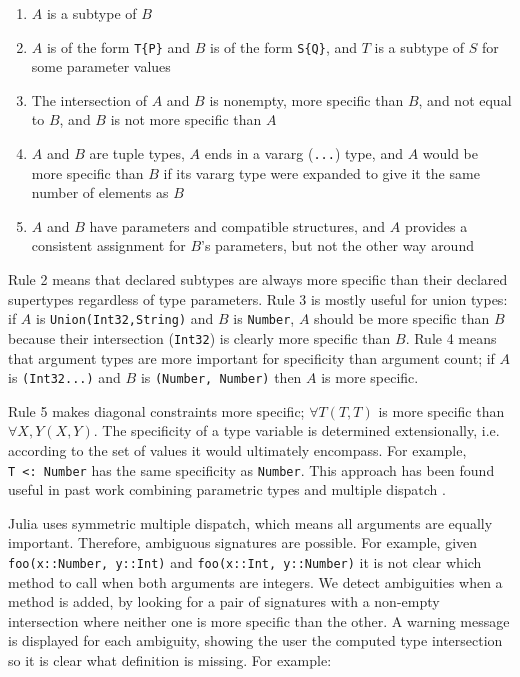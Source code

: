 \documentclass[9pt]{sigplanconf}
\begin{document}
\begin{enumerate}
\item $A$ is a subtype of $B$
\item $A$ is of the form {\tt T\{P\}} and $B$ is of the form {\tt S\{Q\}}, and
$T$ is a subtype of $S$ for some parameter values
\item The intersection of $A$ and $B$ is nonempty, more specific than $B$, and
not equal to $B$, and $B$ is not more specific than $A$
\item $A$ and $B$ are tuple types, $A$ ends in a vararg ({\tt ...}) type,
and $A$ would be more specific than $B$ if its vararg type were expanded to
give it the same number of elements as $B$
\item $A$ and $B$ have parameters and compatible structures, and $A$
provides a consistent assignment for $B$'s parameters, but not the other
way around
\end{enumerate}

Rule 2 means that declared subtypes are always more specific than their
declared supertypes regardless of type parameters. Rule 3 is mostly useful for
union types: if $A$ is {\tt Union(Int32,String)} and $B$ is {\tt Number}, $A$
should
be more specific than $B$ because their intersection ({\tt Int32}) is clearly
more specific than $B$. Rule 4 means that argument types are more important for
specificity than argument count; if $A$ is {\tt (Int32...)} and $B$ is
{\tt (Number, Number)} then $A$ is more specific.

Rule 5 makes diagonal constraints more specific; $\forall T (T,T)$ is more
specific than $\forall X,Y (X,Y)$.
The specificity of a type variable is determined extensionally, i.e.
according to the set of values it would ultimately encompass. For example,
{\tt T~<:~Number} has the same specificity as {\tt Number}. This approach
has been found useful in past work combining parametric types and multiple
dispatch \cite{modularmultipledispatch}.

Julia uses symmetric multiple dispatch, which means all arguments
are equally important. Therefore, ambiguous signatures are possible.
For example, given {\tt foo(x::Number, y::Int)} and
{\tt foo(x::Int, y::Number)} it is not clear which method to call when both
arguments are integers. We detect ambiguities when a method is added, by
looking for a pair of signatures with a non-empty intersection where neither
one is more specific than the other. A warning message is displayed for each
ambiguity, showing the user the computed type intersection so it is clear what
definition is missing. For example:
\end{document}
